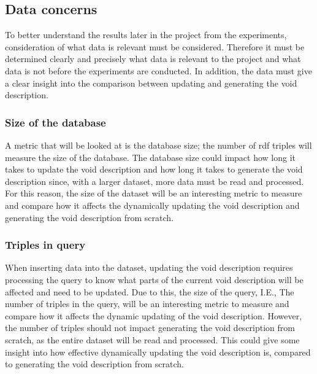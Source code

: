 \subsection{Data concerns}\label{sec:concerns}
To better understand the results later in the project from the experiments, consideration of what data is relevant must be considered. Therefore it must be determined clearly and precisely what data is relevant to the project and what data is not before the experiments are conducted. In addition, the data must give a clear insight into the comparison between updating and generating the \gls{void} description.

\subsubsection{Size of the database}
A metric that will be looked at is the database size; the number of \gls{rdf} triples will measure the size of the database. The database size could impact how long it takes to update the \gls{void} description and how long it takes to generate the \gls{void} description since, with a larger dataset, more data must be read and processed. For this reason, the size of the dataset will be an interesting metric to measure and compare how it affects the dynamically updating the \gls{void} description and generating the \gls{void} description from scratch.

\subsubsection{Triples in query}
When inserting data into the dataset, updating the \gls{void} description requires processing the query to know what parts of the current \gls{void} description will be affected and need to be updated. Due to this, the size of the query, I.E., The number of triples in the query, will be an interesting metric to measure and compare how it affects the dynamic updating of the \gls{void} description. However, the number of triples should not impact generating the \gls{void} description from scratch, as the entire dataset will be read and processed. This could give some insight into how effective dynamically updating the \gls{void} description is, compared to generating the \gls{void} description from scratch.

